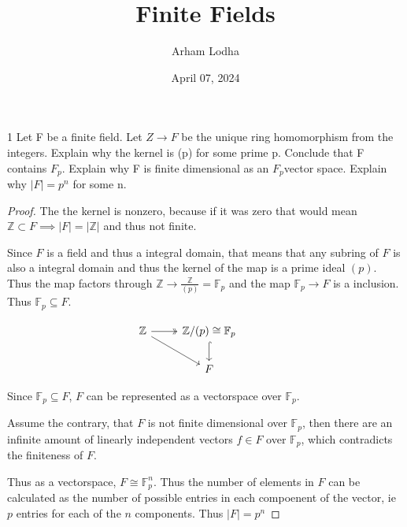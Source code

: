 \documentclass{article}
\newcommand{\Z}{\mathbb{Z}}
\newcommand{\F}{\mathbb{F}}
\begin{document}
\title{Finite Fields}
\author{Arham Lodha}%
\date{April 07, 2024}%
\maketitle

\begin{PROB}{1}\label{Problem 1.}
    Let F be a finite field. Let $Z \to F$ be the unique ring homomorphism from the integers. Explain why the kernel is (p) for some prime p.  Conclude that F contains $F_p$. Explain why F is finite dimensional as an $F_p $vector space. Explain why $|F| = p^n$ for some n.   
\end{PROB}
\begin{proof}
    The the kernel is nonzero, because if it was zero that would mean $\Z \subset F \implies |F| = |\Z|$ and thus not finite. 
    
    Since $F$ is a field and thus a integral domain, that means that any subring of $F$ is also a integral domain and thus the kernel of the map is a prime ideal $(p)$. Thus the map factors through $\Z \to \frac{\Z}{(p)} = \F_p$ and the map $\F_p \to F$ is a inclusion. Thus $\F_p \subseteq F$.

    \[\begin{tikzcd}
        \Z & {\Z/(p)\cong\F_p} & {} \\
        & F
        \arrow[two heads, from=1-1, to=1-2]
        \arrow[from=1-1, to=2-2]
        \arrow[hook, from=1-2, to=2-2]
    \end{tikzcd}\]
    

    Since $\F_p \subseteq F$, $F$ can be represented as a vectorspace over $\F_p$. 
    
    Assume the contrary, that $F$ is not finite dimensional over $\F_p$, then there are an infinite amount of linearly independent vectors $f \in F$ over $\F_p$, which contradicts the finiteness of $F$.

    Thus as a vectorspace, $F \cong \F_p^n$. Thus the number of elements in $F$ can be calculated as the number of possible entries in each compoenent of the vector, ie $p$ entries for each of the $n$ components. Thus $|F| = p^n$     
\end{proof}

\bigskip
\end{document}
